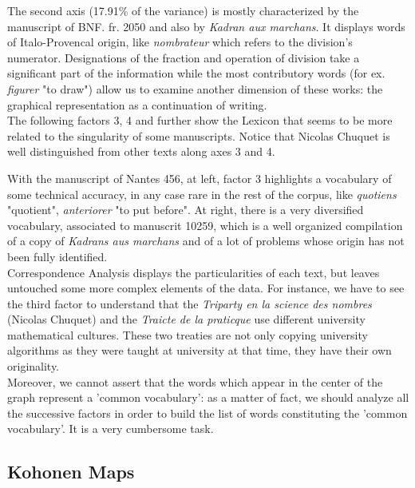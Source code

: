 \documentclass[preprint]{elsarticle}
\begin{document}
The second axis (17.91\% of the variance) is mostly characterized by the manuscript of BNF. fr. 2050 and also by \textit{Kadran aux marchans}. It displays words of Italo-Provencal origin, like \textit{nombrateur} which refers to the division's numerator. Designations of the fraction and operation of division take a significant part of the information while the most contributory words (for ex. \textit{figurer} "to draw") allow us to examine another dimension of these works: the graphical representation as a continuation of writing.\\

The following factors 3, 4 and further show the Lexicon that seems to be more related to the singularity of some manuscripts. Notice that Nicolas Chuquet is well distinguished from other texts along axes 3 and 4.%

With the manuscript of Nantes 456, at left, factor 3 highlights a vocabulary of some technical accuracy, in any case rare in the rest of the corpus, like \textit{quotiens} "quotient", \textit{anteriorer} "to put before". At right, there is a very diversified vocabulary, associated to manuscrit 10259, which is a well organized compilation of a copy of \textit{Kadrans aus marchans} and of a lot of problems whose origin has not been fully identified.\\ 

Correspondence Analysis displays the particularities of each text, but leaves untouched some more complex elements of the data. For instance, we have to see the third factor to understand that the  \textit{Triparty en la science des nombres} (Nicolas Chuquet) and the \textit{Traicte de la praticque} use different university mathematical cultures. These two treaties are not only copying university algorithms as they were taught at university at that time, they have their own originality.\\

Moreover, we cannot assert that the words which appear in the center of the graph represent a 'common vocabulary': as a matter of fact, we should  analyze all the successive factors in order to build the list of words constituting the 'common vocabulary'. It is a very cumbersome task.\\

\subsection{Kohonen Maps}
\end{document}
